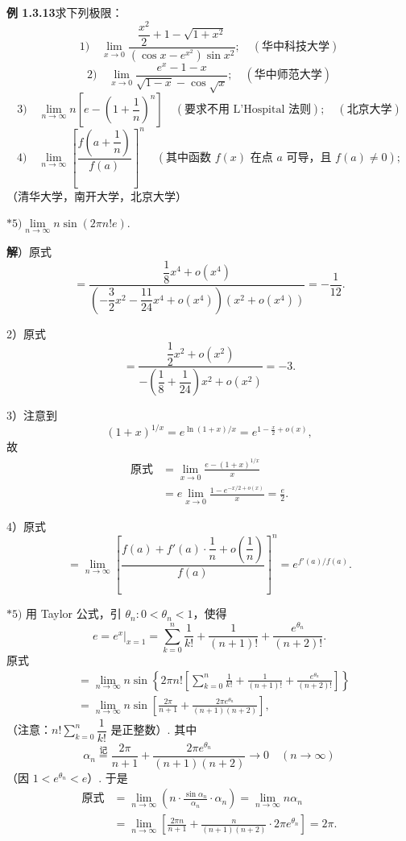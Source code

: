 \documentclass[UTF8, 12pt, fontset=fandol, oneside]{ctexart}
\begin{document}
\noindent\textbf{例 1.3.13}\quad 求下列极限：
\[
1)\quad
\lim_{x\to0}\frac{\dfrac{x^2}{2}+1-\sqrt{1+x^2}}
{(\cos x-e^{x^2})\sin x^2};\quad(\text{华中科技大学})
\]
\[
2)\quad
\lim_{x\to0}\frac{e^x-1-x}{\sqrt{1-x}-\cos\sqrt x};\quad(\text{华中师范大学})
\]
\[
3)\quad
\lim_{n\to\infty}n\left[e-\left(1+\frac1n\right)^n\right]\quad
(\text{要求不用 L'Hospital 法则});\quad(\text{北京大学})
\]
\[
4)\quad
\lim_{n\to\infty}\left[\frac{f\left(a+\dfrac1n\right)}{f(a)}\right]^n
\quad(\text{其中函数 }f(x)\text{ 在点 }a\text{ 可导，且 }f(a)\ne0);
\]
（清华大学，南开大学，北京大学）

$*5)$\quad $\lim\limits_{n\to\infty}n\sin(2\pi n!e)$.

\noindent\textbf{解}）原式
\[
  =\frac{\dfrac18x^4+o(x^4)}
  {\left(-\dfrac32x^2-\dfrac{11}{24}x^4+o(x^4)\right)(x^2+o(x^4))}
  =-\frac1{12}.
\]

2）原式
\[
  =\frac{\dfrac12x^2+o(x^2)}
  {-\left(\dfrac18+\dfrac1{24}\right)x^2+o(x^2)}
  =-3.
\]

3）注意到
\[
  (1+x)^{1/x}=e^{\ln(1+x)/x}
  =e^{1-\frac{x}{2}+o(x)},
\]
故
\[
\begin{aligned}
\text{原式}
&=\lim_{x\to0}\frac{e-(1+x)^{1/x}}x\\
&=e\lim_{x\to0}\frac{1-e^{-x/2+o(x)}}x=\frac e2.
\end{aligned}
\]

4）原式
\[
  =\lim_{n\to\infty}
  \left[
    \frac{f(a)+f'(a)\cdot\dfrac1n+o\left(\dfrac1n\right)}
    {f(a)}
  \right]^n
  =e^{f'(a)/f(a)}.
\]

$*5)$ 用 Taylor 公式，引 $\theta_n:0<\theta_n<1$，使得
\[
  e=e^x\big|_{x=1}
  =\sum_{k=0}^n\frac1{k!}
  +\frac1{(n+1)!}+\frac{e^{\theta_n}}{(n+2)!}.
\]
原式
\[
\begin{aligned}
&=\lim_{n\to\infty}n\sin\left\{2\pi n!\left[
\sum_{k=0}^n\frac1{k!}
+\frac1{(n+1)!}+\frac{e^{\theta_n}}{(n+2)!}
\right]\right\}\\
&=\lim_{n\to\infty}n\sin\left[
\frac{2\pi}{n+1}
+\frac{2\pi e^{\theta_n}}{(n+1)(n+2)}
\right],
\end{aligned}
\]
（注意：$n!\sum\limits_{k=0}^n\dfrac1{k!}$ 是正整数）. 其中
\[
  \alpha_n\stackrel{\text{记}}{=}
  \frac{2\pi}{n+1}
  +\frac{2\pi e^{\theta_n}}{(n+1)(n+2)}
  \to0\quad(n\to\infty)
\]
（因 $1<e^{\theta_n}<e$）. 于是
\[
\begin{aligned}
\text{原式}
&=\lim_{n\to\infty}\left(n\cdot\frac{\sin\alpha_n}{\alpha_n}\cdot\alpha_n\right)
=\lim_{n\to\infty}n\alpha_n\\
&=\lim_{n\to\infty}
\left[\frac{2\pi n}{n+1}
+\frac{n}{(n+1)(n+2)}\cdot2\pi e^{\theta_n}\right]
=2\pi.
\end{aligned}
\]
\end{document}
